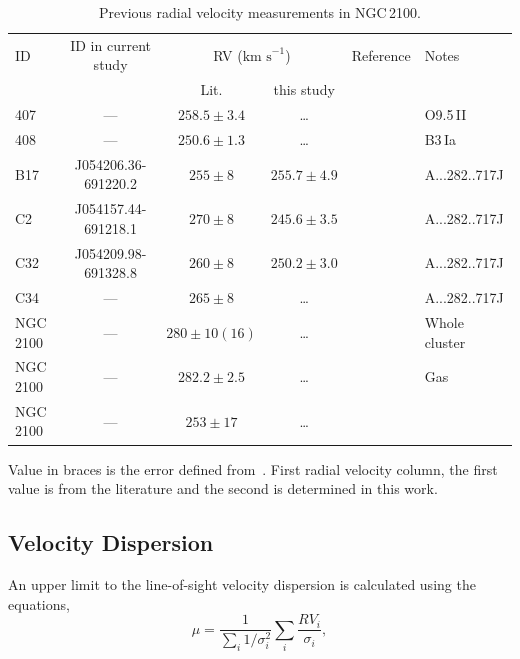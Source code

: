 \documentclass[useAMS,usenatbib]{mn2e}
\def\kms{$\mbox{km s}^{-1}$}
\begin{document}
\begin{table}
\caption{
        Previous radial velocity measurements in NGC\,2100.\label{tb:rvs}
        }
\scriptsize
\begin{center}
\begin{tabular}{lcccll}
 \hline
 \hline
ID & ID in current study & \multicolumn{2}{c}{RV (\kms)}  & Reference & Notes \\
& & Lit. & this study\\
 \hline
407 & ---         & $258.5\pm3.4$     & \ldots        & \cite{2015arXiv150803490E} &  O9.5\,II  \\
408 & ---         & $250.6\pm1.3$     & \ldots        & \cite{2015arXiv150803490E} &  B3\,Ia    \\
B17 & J054206.36-691220.2 & $255\pm8$ & $255.7\pm4.9$ & {\cite{1994A&A...282..717J}} \\
C2  & J054157.44-691218.1 & $270\pm8$ & $245.6\pm3.5$ & {\cite{1994A&A...282..717J}} \\
C32 & J054209.98-691328.8 & $260\pm8$ & $250.2\pm3.0$ & {\cite{1994A&A...282..717J}} \\
C34 & ---         & $265\pm8$         & \ldots        & {\cite{1994A&A...282..717J}} & \\
NGC\,2100 & ---   & $280\pm10(16)$    & \ldots        & {\cite{1972MNRAS.159..445A}} & Whole cluster\\
NGC\,2100 & --- & $282.2\pm2.5$       & \ldots        & {\cite{1971ApJ...169..271S}} & Gas\\
NGC\,2100 & --- & $253\pm17$          & \ldots        & {\cite{1970PhD...........F}} & \\

\hline
\end{tabular}
\end{center}
{Value in braces is the error defined from~\cite{1983ApJ...272..488F}.
First radial velocity column, the first value is from the literature and the second is determined in this work.}
\end{table}

\subsection{Velocity Dispersion} %
\label{sub:velocity_dispersion}

An upper limit to the line-of-sight velocity dispersion is calculated using the equations,
\begin{equation}
  \mu = \frac{1}{\sum_{i} 1/\sigma_{i}^{2}} \sum_{i} \frac{RV_{i}}{\sigma_{i}},
\end{equation}
\end{document}
